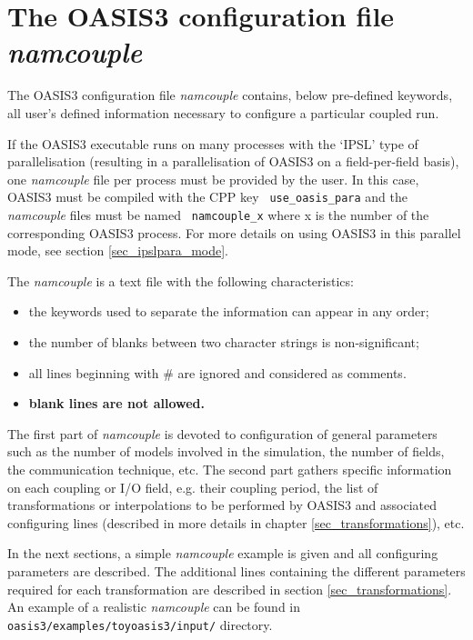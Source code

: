 \newpage
\chapter{The OASIS3 configuration file {\it namcouple}}
\label{sec_namcouple}

The OASIS3 configuration file {\em namcouple} contains, below
pre-defined keywords, all user's
defined information necessary to configure a particular coupled
run. 

If the OASIS3 executable runs on many processes with the `IPSL' type
of parallelisation
(resulting in a parallelisation of OASIS3 on a field-per-field
basis), one {\it namcouple} file per process must be provided by
the user. In this case, OASIS3 must be compiled with the CPP key {\tt
  use\_oasis\_para} and the {\it namcouple} files must be named {\tt
  namcouple\_x} where x is the number of the corresponding OASIS3
process. For more details on using OASIS3 in this parallel
mode, see section \ref{sec_ipslpara_mode}.

The {\it namcouple} is a text file with the following
characteristics:

\begin{itemize}
\item the keywords used to separate the information
can appear in any order;
\item the number of blanks between two character strings is
non-significant; 
\item all lines beginning with \# are ignored and considered as
comments.
\item {\bf blank lines are not allowed.}
\end{itemize}
\vspace*{0.5cm}

The first part of {\em namcouple } is devoted to configuration of
general parameters such as the number of models involved in the
simulation, the number of fields, the communication technique, etc.
The second part gathers specific information on each coupling or I/O
field, e.g. their coupling period, the list of transformations or
interpolations to be performed by OASIS3 and associated
configuring lines (described in more details in chapter
\ref{sec_transformations}), etc.

\vspace*{0.5cm}

In the next sections, a simple {\it namcouple} example is given and
all configuring parameters are described. The additional lines
containing the different parameters required for each transformation
are described in section \ref{sec_transformations}. An example of a
realistic {\em namcouple} can be found in 
{\tt
oasis3/examples/toyoasis3/input/} directory.

